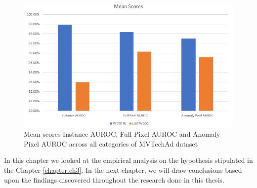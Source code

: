 \begin{figure}[t]
	\begin{center}
		\includegraphics[width=1.0\linewidth]{Chapter_4/llm_clip_mean.png}
	\end{center}
	\caption{Mean scores Instance AUROC, Full Pixel AUROC and Anomaly Pixel AUROC across all categories of MVTechAd dataset}
	\label{fig:llm_clip_mean}
\end{figure}

In this chapter we looked at the empirical analysis on the hypothesis stipulated in the Chapter \ref{chapter:ch3}. In the next chapter, we will draw conclusions based upon the findings discovered throughout the research done in this thesis.